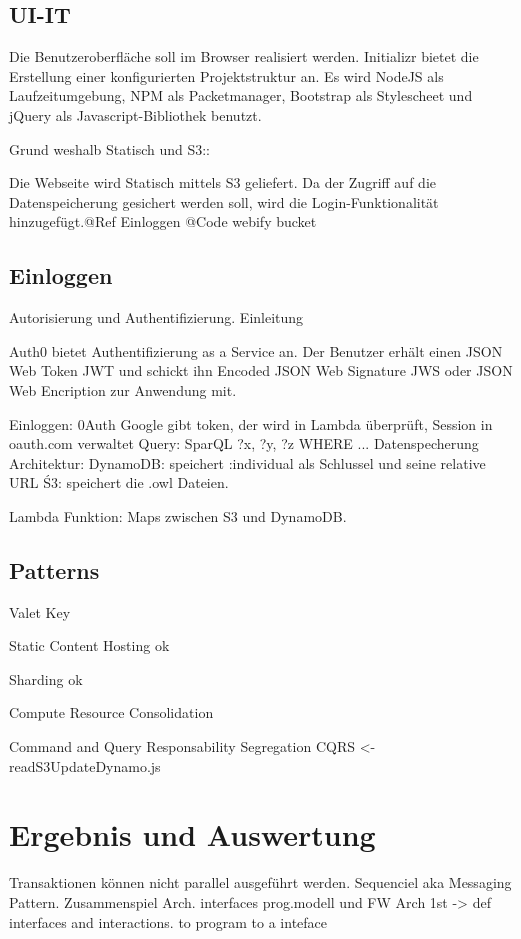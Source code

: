 \documentclass[
12pt,
english,
ngerman,
headsepline,
twoside,
openright,
numbers=noenddot,version=first
]{scrreprt}
\begin{document}
\section{UI-IT}

Die Benutzeroberfläche soll im Browser realisiert werden. Initializr bietet die Erstellung einer konfigurierten Projektstruktur an. Es wird NodeJS als Laufzeitumgebung, NPM als Packetmanager, Bootstrap als Stylescheet und jQuery als Javascript-Bibliothek benutzt.

Grund weshalb Statisch und S3::

Die Webseite wird Statisch mittels S3 geliefert. Da der Zugriff auf die Datenspeicherung gesichert werden soll, wird die Login-Funktionalität hinzugefügt.@Ref Einloggen
@Code webify bucket



\section{Einloggen}

Autorisierung und Authentifizierung. Einleitung

Auth0 bietet Authentifizierung as a Service an. Der Benutzer erhält einen JSON Web Token JWT und schickt ihn Encoded JSON Web Signature JWS oder JSON Web Encription zur Anwendung mit.


Einloggen: 0Auth Google gibt token, der wird in Lambda überprüft, Session in oauth.com verwaltet
Query: SparQL ?x, ?y, ?z WHERE ...
Datenspecherung Architektur:
DynamoDB: speichert :individual als Schlussel und seine relative URL
Ś3: speichert die .owl Dateien.

Lambda Funktion: Maps zwischen S3 und DynamoDB.

\section{Patterns}

Valet Key \cite{homer2014cloud}

Static Content Hosting ok

Sharding ok

Compute Resource Consolidation

Command and Query Responsability Segregation CQRS <- readS3UpdateDynamo.js

\chapter{Ergebnis und Auswertung}
Transaktionen können nicht parallel ausgeführt werden. Sequenciel aka Messaging Pattern.
Zusammenspiel Arch. interfaces prog.modell und FW
Arch 1st -> def interfaces and interactions. to program to a inteface
\end{document}
